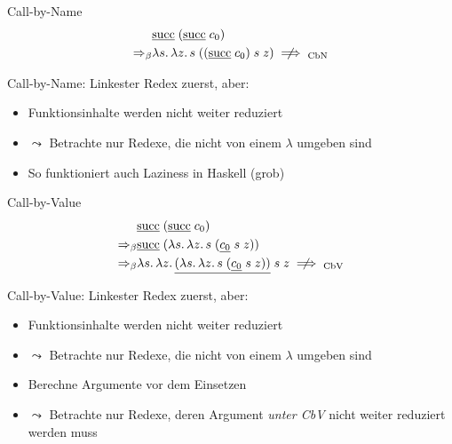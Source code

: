 \documentclass{beamer}
\begin{document}
\begin{frame}{Call-by-Name}
        \begin{eqnarray*}
          &
          \app{
            \uline{\csucc}
          }{
            (\app{\uline{\csucc}}{\cn{0}})
          } \\
          \Rightarrow_\beta&
          \lam{s}{\lam{z}{\app{s}{(\app{\app{(\app{\uline{\csucc}}{\cn{0}})}{s}}{z})}}} \centernot\implies_{\text{CbN}}
        \end{eqnarray*}

        \vfill

        Call-by-Name: Linkester Redex zuerst, aber:

        \begin{itemize}
          \item Funktionsinhalte werden nicht weiter reduziert
          \item $\leadsto$ Betrachte nur Redexe, die nicht von einem $\lambda$ umgeben sind
          \item So funktioniert auch Laziness in Haskell (grob)
        \end{itemize}
\end{frame}

\begin{frame}{Call-by-Value}
        \begin{eqnarray*}
          &
          \app{
            \uline{\csucc}
          }{
            (\app{\uline{\csucc}}{\cn{0}})
          } \\
          \Rightarrow_\beta&
          \app{
            \uline{\csucc}
          }{
            (\lam{s}{\lam{z}{
              \app{s}{
                (\app{\app{\uline{\cn{0}}}{s}}{z})
              }
            }})
          } \\
          \Rightarrow_\beta&
          \lam{s}{\lam{z}{
          \app{\app{
            \uline{(\lam{s}{\lam{z}{
              \app{s}{
                (\app{\app{\uline{\cn{0}}}{s}}{z})
              }
            }})}
          }{s}}{z}
          }} \centernot\implies_\text{CbV}
        \end{eqnarray*}
        \vfill

        Call-by-Value: Linkester Redex zuerst, aber:

        \begin{itemize}
          \item Funktionsinhalte werden nicht weiter reduziert
          \item $\leadsto$ Betrachte nur Redexe, die nicht von einem $\lambda$ umgeben sind
          \item Berechne Argumente vor dem Einsetzen
          \item $\leadsto$ Betrachte nur Redexe, deren Argument \emph{unter CbV} nicht weiter reduziert werden muss
        \end{itemize}
\end{frame}
\end{document}
